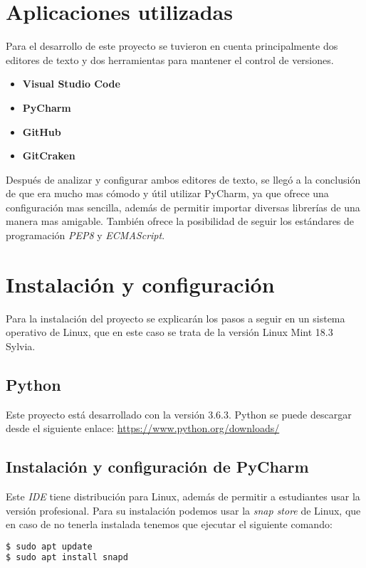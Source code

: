 \section{Aplicaciones utilizadas}
Para el desarrollo de este proyecto se tuvieron en cuenta principalmente dos editores de texto y dos herramientas para mantener el control de versiones.

\begin{itemize}
	\item \textbf{Visual Studio Code} 
	\item \textbf{PyCharm}
	\item \textbf{GitHub}
	\item \textbf{GitCraken}
\end{itemize}
Después de analizar y configurar ambos editores de texto, se llegó a la conclusión de que era mucho mas cómodo y útil utilizar PyCharm, ya que ofrece una configuración mas sencilla, además de permitir importar diversas librerías de una manera mas amigable. También ofrece la posibilidad de seguir los estándares de programación \textit{PEP8} y \textit{ECMAScript}.

\section{Instalación y configuración}
Para la instalación del proyecto se explicarán los pasos a seguir en un sistema operativo de Linux, que en este caso se trata de la versión Linux Mint 18.3 Sylvia.

\subsection{Python}

Este proyecto está desarrollado con la versión 3.6.3. Python se puede descargar desde el siguiente enlace: 
\url{https://www.python.org/downloads/}

\subsection{Instalación y configuración de PyCharm}
Este \textit{IDE} tiene distribución para Linux, además de permitir a estudiantes usar la versión profesional. Para su instalación podemos usar la \textit{snap store} de Linux, que en caso de no tenerla instalada tenemos que ejecutar el siguiente comando:

\renewcommand{\lstlistingname}{Instalar PyCharm}%
\renewcommand{\lstlistlistingname}{List of \lstlistingname s}
\begin{lstlisting}[language=bash,caption={Instalar snapd}]
$ sudo apt update
$ sudo apt install snapd
\end{lstlisting}

